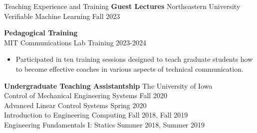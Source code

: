 \begin{rSection}{Teaching Experience and Training}
    {\bf Guest Lectures} \hfill Northeastern University\\
    Verifiable Machine Learning \hfill Fall 2023

    {\bf Pedagogical Training}\\
    MIT Communications Lab Training \hfill 2023-2024
    \begin{itemize}
        \item Participated in ten training sessions designed to teach graduate students how to become effective coaches in various aspects of technical communication.
    \end{itemize}

    {\bf Undergraduate Teaching Assistantship} \hfill The University of Iowa\\
    Control of Mechanical Engineering Systems \hfill Fall 2020\\
    Advanced Linear Control Systems \hfill Spring 2020\\
    Introduction to Engineering Computing \hfill Fall 2018, Fall 2019\\
    Engineering Fundamentals I: Statics \hfill Summer 2018, Summer 2019\\

\end{rSection}
